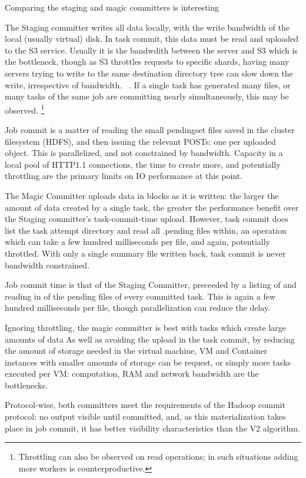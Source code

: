 \documentclass[9pt,technote]{IEEEtran}
\begin{document}
Comparing the staging and magic committers is interesting

The Staging committer writes all data locally, with the write bandwidth
of the local (usually virtual) disk.
In task commit, this data must be read and uploaded to the S3 service.
Usually it is the bandwdith between the server and S3 which is the bottleneck,
though as S3 throttles requests to specific shards, having many servers trying
to write to the same destination directory tree can slow down the write, irrespective
of bandwidth.
\ \cite{cite}.
If a single task has generated many files, or many tasks of the same job are
committing nearly simultaneously, this may be observed.
\footnote{Throttling can also be observed on read operations;
in such situations adding more workers is counterproductive.}

Job commit is a matter of reading the small pendingset files saved in the
cluster filesystem (HDFS), and then issuing the relevant POSTs: one per uploaded
object.
This is parallelized, and not constrained by bandwidth.
Capacity in a local pool of HTTP1.1 connections, the time to create more,
and potentially throttling are the primary limits on IO performance at this point.

The Magic Committer uploads data in blocks as it is written: the larger
the amount of data created by a single task, the greater the performance
benefit over the Staging committer's task-commit-time upload.
However, task commit does list the task attempt directory and read all .pending
files within, an operation which can take a few hundred milliseconds per file,
and again, potentially throttled.
With only a single summary file written back, task commit is never
bandwidth constrained.

Job commit time is that of the Staging Committer, preceeded by a listing
of and reading in of the pending files of every committed task.
This is again a few hundred milliseconds per file, though parallelization
can reduce the delay.

Ignoring throttling, the magic committer is best with tasks which create
large amounts of data
As well as avoiding the upload in the task commit, by reducing the
amount of storage needed in the virtual machine, VM and Container instances
with smaller amounts of storage can be request, or simply more tasks executed
per VM: computation, RAM and network bandwidth are the bottlenecks.

Protocol-wise, both committers meet the requirements of the Hadoop commit
protocol: no output visible until committed, and, as this materialization
takes place in job commit, it has better visibility characteristics than
the V2 algorithm.
\end{document}
